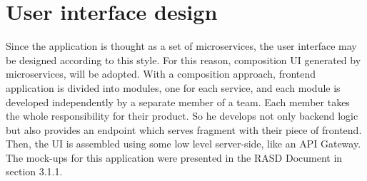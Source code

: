 \section{User interface design}
Since the application is thought as a set of  microservices, the user interface may be designed according to this style. 
For this reason, composition UI generated by microservices, will be adopted. 
With a composition approach, frontend application is divided into modules, one for each service, and each module is developed independently by a separate member of a team. 
Each member takes the whole responsibility for their product. 
So he develops not only backend logic but also provides an endpoint which serves fragment with their piece of frontend. 
Then, the UI is assembled using some low level server-side, like an API Gateway. 
The mock-ups for this application were presented in the RASD Document in section 3.1.1. 